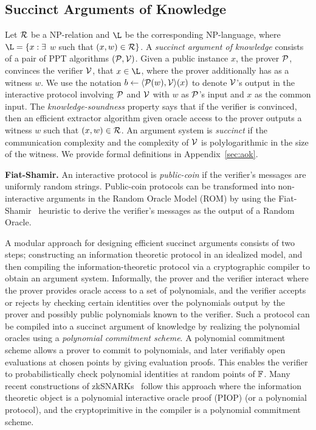\subsection{Succinct Arguments of Knowledge}
Let $\mathcal{R}$ be a NP-relation and $\L$ be the corresponding NP-language, where $\L=\{x : \exists$ $w$ such that $(x,w) \in \mathcal{R}\}$. 
A \emph{succinct argument of knowledge} consists of a pair of PPT algorithms $(\mathcal{P},\mathcal{V})$.
Given a public instance $x$, the prover $\mathcal{P}$, convinces the verifier $\mathcal{V}$, that $x\in \L$, where the prover additionally has as a witness $w$.
We use the notation $b\gets \langle {\ensuremath{\mathcal{P}}}({w}), {\mathcal{V}}\rangle({x})$ to denote $\mathcal{V}$'s output in the interactive
protocol involving $\mathcal{P}$ and $\mathcal{V}$ with $w$ as $\mathcal{P}$'s input and $x$ as the common input.
The \emph{knowledge-soundness} property says that if the verifier is convinced, then an efficient extractor algorithm given oracle access to the prover outputs a witness $w$ such that $(x,w)\in \mathcal{R}$. An argument system is \emph{succinct} if the communication complexity and the complexity of $\mathcal{V}$ is polylogarithmic in the size of the witness. We provide formal definitions in Appendix~\ref{sec:aok}.

\smallskip

\noindent\textbf{Fiat-Shamir.} An interactive protocol is \emph{public-coin} if the verifier's messages are uniformly random strings. Public-coin protocols can be transformed into non-interactive arguments in the Random Oracle Model (ROM) by using the Fiat-Shamir~\cite{C:FiaSha86} heuristic to derive the verifier's messages as the output of a Random Oracle. 

\smallskip

A modular approach for designing efficient succinct arguments consists of two steps; constructing an information theoretic protocol in an idealized model, and then compiling the information-theoretic protocol via a cryptographic compiler to obtain an argument system. 
Informally, the prover and the verifier interact where the prover provides oracle access to a set of polynomials, and the verifier accepts or rejects by checking certain identities over the polynomials output by the prover and possibly public polynomials known to the verifier. Such a protocol can be compiled into a succinct argument of knowledge by realizing the polynomial oracles using a \emph{polynomial commitment scheme}. A polynomial commitment scheme allows a prover to commit to polynomials, and later verifiably open evaluations at chosen points by giving evaluation proofs. This enables the verifier to probabilistically
check polynomial identities at random points of $\mathbb{F}$. %
Many recent constructions of zkSNARKs~\cite{EC:BunFisSze20,EC:CHMMVW20,Gabizon2019PLONKPO} follow this approach where the information theoretic object is a polynomial interactive oracle proof (PIOP) (or a polynomial protocol), and the cryptoprimitive in the compiler is a polynomial commitment scheme.

